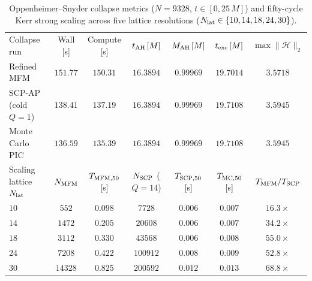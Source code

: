 \documentclass[twocolumn,prx,aps,superscriptaddress,nofootinbib,floatfix]{revtex4-2}
\begin{document}
\begin{table}[t]
\caption{\label{tab:supp_os_scale}%
Oppenheimer--Snyder collapse metrics ($N = 9328$, $t \in [0, 25\,M]$) and fifty-cycle Kerr strong scaling across five lattice resolutions ($N_{\rm lat} \in \{10, 14, 18, 24, 30\}$).}
\begin{ruledtabular}
\begin{tabular}{lcccccc}
Collapse run & Wall [s] & Compute [s] & $t_{\rm AH}\,[M]$ & $M_{\rm AH}\,[M]$ & $t_{\rm exc}\,[M]$ & $\max\|\mathcal{H}\|_2$ \\
\colrule
Refined MFM & $151.77$ & $150.31$ & $16.3894$ & $0.99969$ & $19.7014$ & $3.5718$ \\
SCP-AP (cold $Q=1$) & $138.41$ & $137.19$ & $16.3894$ & $0.99969$ & $19.7108$ & $3.5945$ \\
Monte Carlo PIC & $136.59$ & $135.39$ & $16.3894$ & $0.99969$ & $19.7108$ & $3.5945$ \\
\colrule
Scaling lattice $N_{\rm lat}$ & $N_{\rm MFM}$ & $T_{\rm MFM,50}$ [s] & $N_{\rm SCP}$ ($Q=14$) & $T_{\rm SCP,50}$ [s] & $T_{\rm MC,50}$ [s] & $T_{\rm MFM}/T_{\rm SCP}$ \\
\colrule
$10$ & $552$ & $0.098$ & $7728$ & $0.006$ & $0.007$ & $16.3\times$ \\
$14$ & $1472$ & $0.205$ & $20608$ & $0.006$ & $0.007$ & $34.2\times$ \\
$18$ & $3112$ & $0.330$ & $43568$ & $0.006$ & $0.008$ & $55.0\times$ \\
$24$ & $7208$ & $0.422$ & $100912$ & $0.008$ & $0.009$ & $52.8\times$ \\
$30$ & $14328$ & $0.825$ & $200592$ & $0.012$ & $0.013$ & $68.8\times$ \\
\end{tabular}
\end{ruledtabular}
\end{table}



\end{document}
